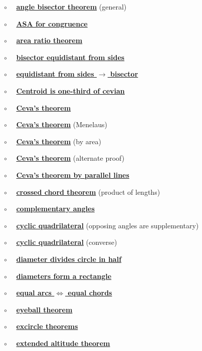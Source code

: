\documentclass[11pt, oneside]{article}
\begin{document}
$\circ$ \ \ \hyperref[sec:generalized_angle_bisector_theorem]{\textbf{angle bisector theorem}} (general)

$\circ$ \ \ \hyperref[sec:ASA]{\textbf{ASA for congruence}}

$\circ$ \ \ \hyperref[sec:area_ratio_theorem]{\textbf{area ratio theorem}}

$\circ$ \ \ \hyperref[sec:bisector_equidistant_sides]{\textbf{bisector equidistant from sides}}

$\circ$ \ \ \hyperref[sec:bisector_equidistant_sides_converse]{\textbf{equidistant from sides $\rightarrow$ bisector}}

$\circ$ \ \ \hyperref[sec:centroid_one_third]{\textbf{Centroid is one-third of cevian}}

$\circ$ \ \ \hyperref[sec:Ceva_theorem]{\textbf{Ceva's theorem}}

$\circ$ \ \ \hyperref[sec:ceva_by_menlaus]{\textbf{Ceva's theorem}} (Menelaus)

$\circ$ \ \ \hyperref[sec:ceva_by_area]{\textbf{Ceva's theorem}} (by area)

$\circ$ \ \ \hyperref[sec:ceva_alternate_proof]{\textbf{Ceva's theorem}} (alternate proof)

$\circ$ \ \ \hyperref[sec:ceva_parallel_lines]{\textbf{Ceva's theorem by parallel lines}}

$\circ$ \ \ \hyperref[sec:Euclid_III_35]{\textbf{crossed chord theorem}} (product of lengths)

$\circ$ \ \ \hyperref[sec:complementary_angle_theorem]{\textbf{complementary angles}}

$\circ$ \ \ \hyperref[sec:quadrilateral_supplementary]{\textbf{cyclic quadrilateral}} (opposing angles are supplementary)

$\circ$ \ \ \hyperref[sec:inscribed_angles_converse]{\textbf{cyclic quadrilateral}} (converse)

$\circ$ \ \ \hyperref[sec:diameter_of_a_circle]{\textbf{diameter divides circle in half}}

$\circ$ \ \ \hyperref[sec:diameters_form_rectangle]{\textbf{diameters form a rectangle}}

$\circ$ \ \ \hyperref[sec:equal_arcs_equal_chords]{\textbf{equal arcs $\iff$ equal chords}}

$\circ$ \ \ \hyperref[sec:eyeball_theorem]{\textbf{eyeball theorem}}

$\circ$ \ \ \hyperref[sec:excircle_theorems]{\textbf{excircle theorems}}

$\circ$ \ \ \hyperref[sec:extended_altitude]{\textbf{extended altitude theorem}}
\end{document}
